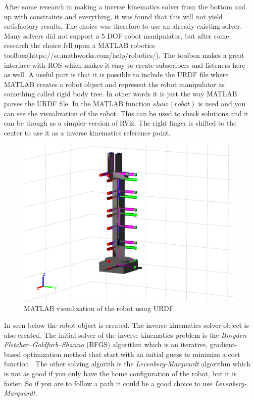 After some research in making a inverse kinematics solver from the bottom and up with constraints and everything, it was found that this will not yield satisfactory results. The choice was therefore to use an already existing solver. Many solvers did not support a 5 DOF robot manipulator, but after some research the choice fell upon a MATLAB robotics toolbox(https://se.mathworks.com/help/robotics/). The toolbox makes a great interface with ROS which makes it easy to create subscribers and listeners here as well. A useful part is that it is possible to include the URDF file where MATLAB creates a robot object and represent the robot manipulator as something called rigid body tree. In other words it is just the way MATLAB parses the URDF file. In  the MATLAB function $show(robot)$ is used and you can see the visualization of the robot. This can be used to check solutions and it can be though as a simpler version of RViz. The right finger is shifted to the center to use it as a inverse kinematics reference point. 

\begin{figure}[htbp]
  \centering
  \includegraphics[width=.9\textwidth]{img/showRobs.eps}
  \caption{MATLAB visualization of the robot using URDF}
  \label{fig:showRovs}
\end{figure}

In  seen below the robot object is created. The inverse kinematics solver object is also created. The initial solver of the inverse kinematics problem is the \textit{Broyden–Fletcher–Goldfarb–Shanno} (BFGS) algorithm which is an iterative, gradient-based optimization method that start with an initial guess to minimize a cost function \cite{MatlabRobTool}. The other solving algorith is the \textit{Levenberg-Marquardt} algorithm which is not as good if you only have the home configuration of the robot, but it is faster. So if you are to follow a path it could be a good choice to use \textit{Levenberg-Marquardt}. 

